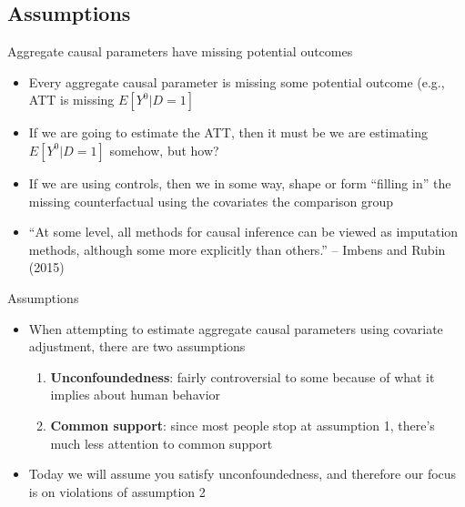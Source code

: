 \documentclass{beamer}
\begin{document}
\subsection{Assumptions}


\begin{frame}{Aggregate causal parameters have missing potential outcomes}


\begin{itemize}
\item Every aggregate causal parameter is missing some potential outcome (e.g., ATT is missing $E[Y^0|D=1]$
\item If we are going to estimate the ATT, then it must be we are estimating $E[Y^0|D=1]$ somehow, but how?
\item If we are using controls, then we in some way, shape or form ``filling in'' the missing counterfactual using the covariates the comparison group
\item ``At some level, all methods for causal inference can be viewed as imputation methods, although some more explicitly than others.'' -- Imbens and Rubin (2015)

\end{itemize}


\end{frame}


\begin{frame}{Assumptions}

\begin{itemize}

\item When attempting to estimate aggregate causal parameters using covariate adjustment, there are two assumptions

	\begin{enumerate}
	\item \textbf{Unconfoundedness}:  fairly controversial to some because of what it implies about human behavior
	\item \textbf{Common support}: since most people stop at assumption 1, there's much less attention to common support
	\end{enumerate}
\item Today we will assume you satisfy unconfoundedness, and therefore our focus is on violations of assumption 2
\end{itemize}

\end{frame}
\end{document}
